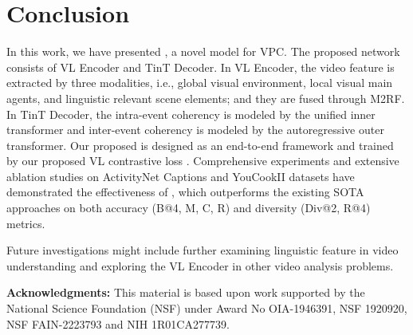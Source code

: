 \documentclass[letterpaper]{article} \usepackage{aaai23}  \usepackage{times}  \usepackage{helvet}  \usepackage{courier}  \usepackage[hyphens]{url}  \usepackage{graphicx} \urlstyle{rm} \def\UrlFont{\rm}  \usepackage{natbib}  \usepackage{caption} \frenchspacing  \setlength{\pdfpagewidth}{8.5in}  \setlength{\pdfpageheight}{11in}  \usepackage{algorithm}
\newcommand{\encoder}{VL Encoder\xspace}
\begin{document}
\begin{table}[t]
\centering
\caption{Computational cost vs. accuracy between VLTinT with different settings and SOTA VPC models.}
\label{tab:complexity}
\end{table}


\section*{Conclusion}
In this work, we have presented \model, a novel model for VPC. The proposed network consists of \encoder and TinT Decoder. In \encoder, the video feature is extracted by three modalities, i.e., global visual environment, local visual main agents, and linguistic relevant scene elements; and they are fused through M2RF. In TinT Decoder, the intra-event coherency is modeled by the unified inner transformer and inter-event coherency is modeled by the autoregressive outer transformer. Our proposed \model is designed as an end-to-end framework and trained by our proposed VL contrastive loss . 
Comprehensive experiments and extensive ablation studies on ActivityNet Captions and YouCookII datasets have demonstrated the effectiveness of \model, which outperforms the existing SOTA approaches on both accuracy (B@4, M, C, R) and diversity (Div@2, R@4) metrics. 


Future investigations might include further examining linguistic feature in video understanding and exploring the VL Encoder in other video analysis problems.


\textbf{Acknowledgments:}
This material is based upon work supported by the National Science Foundation (NSF) under Award No OIA-1946391, NSF 1920920, NSF FAIN-2223793 and NIH 1R01CA277739.

\footnotesize

\end{document}
